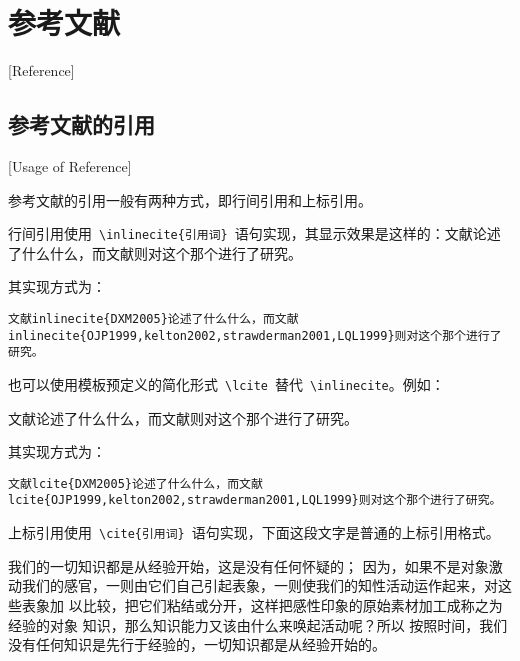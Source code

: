 
%
%
%

\chapter{参考文献}[Reference]
\label{chap07}

\section{参考文献的引用}[Usage of Reference]

参考文献的引用一般有两种方式，即行间引用和上标引用。

行间引用使用~\verb|\inlinecite{引用词}|~语句实现，其显示效果是这样的：文献论述了什么什么，而文献则对这个那个进行了研究。

其实现方式为：

\texttt{文献\cs inlinecite\{DXM2005\}论述了什么什么，而文献\cs inlinecite\{OJP1999,kelton2002,strawderman2001,LQL1999\}则对这个那个进行了研究。}

也可以使用模板预定义的简化形式~\verb|\lcite|~替代~\verb|\inlinecite|。例如：

文献论述了什么什么，而文献则对这个那个进行了研究。

其实现方式为：

\texttt{文献\cs lcite\{DXM2005\}论述了什么什么，而文献\cs lcite\{OJP1999,kelton2002,strawderman2001,LQL1999\}则对这个那个进行了研究。}

上标引用使用~\verb|\cite{引用词}|~语句实现，下面这段文字是普通的上标引用格式。

我们的一切知识都是从经验开始\cite{LQL1999}，这是没有任何怀疑的\cite{DXM2005}\cite{DXM2000}；
因为，如果不是对象激动我们的感官，一则由它们自己引起表象，一则使我们的知性活动运作起来，对这些表象加
以比较，把它们粘结或分开\cite{OJP1999,OJP1991}，这样把感性印象的原始素材加工成称之为经验的对象
知识，那么知识能力又该由什么来唤起活动呢\cite{braun2007,kelton2002,strawderman2001,LQL1999}？所以
按照时间，我们没有任何知识是先行于经验的，一切知识都是从经验开始的。

